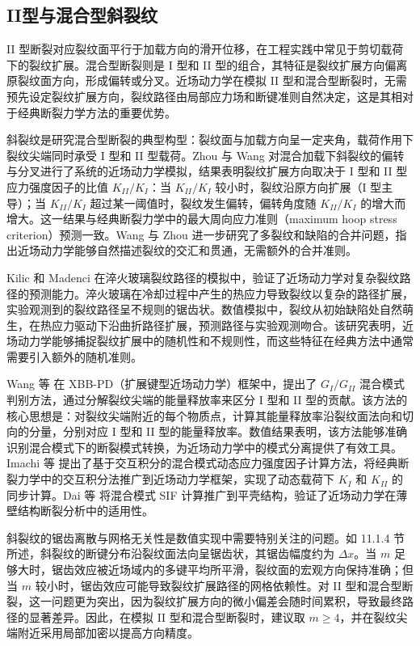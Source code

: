 \subsection{II型与混合型斜裂纹}\label{sec:ch11-mode-ii-mixed}

II 型断裂对应裂纹面平行于加载方向的滑开位移，在工程实践中常见于剪切载荷下的裂纹扩展。混合型断裂则是 I 型和 II 型的组合，其特征是裂纹扩展方向偏离原裂纹面方向，形成偏转或分叉。近场动力学在模拟 II 型和混合型断裂时，无需预先设定裂纹扩展方向，裂纹路径由局部应力场和断键准则自然决定，这是其相对于经典断裂力学方法的重要优势。

斜裂纹是研究混合型断裂的典型构型：裂纹面与加载方向呈一定夹角，载荷作用下裂纹尖端同时承受 I 型和 II 型载荷。Zhou 与 Wang \cite{ZhouWang2016} 对混合加载下斜裂纹的偏转与分叉进行了系统的近场动力学模拟，结果表明裂纹扩展方向取决于 I 型和 II 型应力强度因子的比值 $K_{II}/K_I$：当 $K_{II}/K_I$ 较小时，裂纹沿原方向扩展（I 型主导）；当 $K_{II}/K_I$ 超过某一阈值时，裂纹发生偏转，偏转角度随 $K_{II}/K_I$ 的增大而增大。这一结果与经典断裂力学中的最大周向应力准则（maximum hoop stress criterion）预测一致。Wang 与 Zhou \cite{WangZhou2016} 进一步研究了多裂纹和缺陷的合并问题，指出近场动力学能够自然描述裂纹的交汇和贯通，无需额外的合并准则。

Kilic 和 Madenci \cite{KilicMadenci2009} 在淬火玻璃裂纹路径的模拟中，验证了近场动力学对复杂裂纹路径的预测能力。淬火玻璃在冷却过程中产生的热应力导致裂纹以复杂的路径扩展，实验观测到的裂纹路径呈不规则的锯齿状。数值模拟中，裂纹从初始缺陷处自然萌生，在热应力驱动下沿曲折路径扩展，预测路径与实验观测吻合。该研究表明，近场动力学能够捕捉裂纹扩展中的随机性和不规则性，而这些特征在经典方法中通常需要引入额外的随机准则。

Wang 等 \cite{Wang2023} 在 XBB-PD（扩展键型近场动力学）框架中，提出了 $G_I/G_{II}$ 混合模式判别方法，通过分解裂纹尖端的能量释放率来区分 I 型和 II 型的贡献。该方法的核心思想是：对裂纹尖端附近的每个物质点，计算其能量释放率沿裂纹面法向和切向的分量，分别对应 I 型和 II 型的能量释放率。数值结果表明，该方法能够准确识别混合模式下的断裂模式转换，为近场动力学中的模式分离提供了有效工具。Imachi 等 \cite{Imachi2018} 提出了基于交互积分的混合模式动态应力强度因子计算方法，将经典断裂力学中的交互积分法推广到近场动力学框架，实现了动态载荷下 $K_I$ 和 $K_{II}$ 的同步计算。Dai 等 \cite{Dai2021} 将混合模式 SIF 计算推广到平壳结构，验证了近场动力学在薄壁结构断裂分析中的适用性。

斜裂纹的锯齿离散与网格无关性是数值实现中需要特别关注的问题。如 11.1.4 节所述，斜裂纹的断键分布沿裂纹面法向呈锯齿状，其锯齿幅度约为 $\Delta x$。当 $m$ 足够大时，锯齿效应被近场域内的多键平均所平滑，裂纹面的宏观方向保持准确；但当 $m$ 较小时，锯齿效应可能导致裂纹扩展路径的网格依赖性。对 II 型和混合型断裂，这一问题更为突出，因为裂纹扩展方向的微小偏差会随时间累积，导致最终路径的显著差异。因此，在模拟 II 型和混合型断裂时，建议取 $m\geq 4$，并在裂纹尖端附近采用局部加密以提高方向精度。

